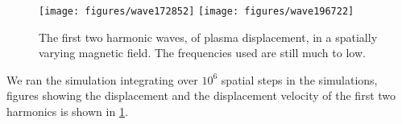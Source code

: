 \documentclass[x11names]{article}
\begin{document}
  \begin{figure}
    \texttt{[image: figures/wave172852]}
    \texttt{[image: figures/wave196722]}
    \caption{The first two harmonic waves, of plasma displacement, in a spatially varying magnetic field. The frequencies used are still much to low.}
    \label{fig:waves}
  \end{figure}

  We ran the simulation integrating over \(10^6\) spatial steps in the simulations, figures showing the displacement and the displacement velocity of the first two harmonics is shown in \cref{fig:waves}.

    
      

\appendix
\end{document}
